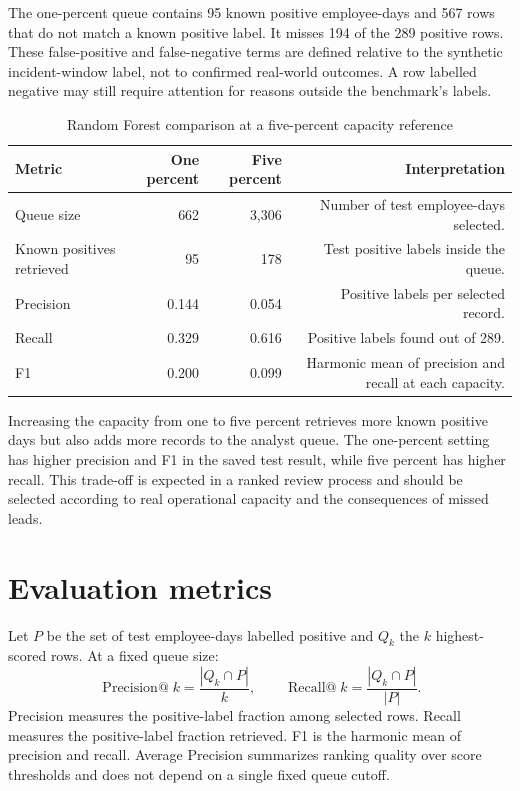 The one-percent queue contains 95 known positive employee-days and 567
rows that do not match a known positive label. It misses 194 of the
289 positive rows. These false-positive and false-negative terms are
defined relative to the synthetic incident-window label, not to
confirmed real-world outcomes. A row labelled negative may still
require attention for reasons outside the benchmark's labels.

\begin{table}[H]
\centering
\tablefont
\caption{Random Forest comparison at a five-percent capacity reference}
\label{tab:five-percent}
\begin{tabularx}{\textwidth}{|p{}|R|R|R|}
\hline
\textbf{Metric} & \textbf{One percent} & \textbf{Five percent} & \textbf{Interpretation}\\\hline
Queue size & 662 & 3,306 & Number of test employee-days selected.\\\hline
Known positives retrieved & 95 & 178 & Test positive labels inside the queue.\\\hline
Precision & 0.144 & 0.054 & Positive labels per selected record.\\\hline
Recall & 0.329 & 0.616 & Positive labels found out of 289.\\\hline
F1 & 0.200 & 0.099 & Harmonic mean of precision and recall at each capacity.\\\hline
\end{tabularx}
\end{table}

Increasing the capacity from one to five percent retrieves more known
positive days but also adds more records to the analyst queue. The
one-percent setting has higher precision and F1 in the saved test
result, while five percent has higher recall. This trade-off is
expected in a ranked review process and should be selected according to
real operational capacity and the consequences of missed leads.

\section{Evaluation metrics}
Let \(P\) be the set of test employee-days labelled positive and
\(Q_k\) the \(k\) highest-scored rows. At a fixed queue size:
\[
\operatorname{Precision@}k = \frac{|Q_k\cap P|}{k},
\qquad
\operatorname{Recall@}k = \frac{|Q_k\cap P|}{|P|}.
\]
Precision measures the positive-label fraction among selected rows.
Recall measures the positive-label fraction retrieved. F1 is the
harmonic mean of precision and recall. Average Precision summarizes
ranking quality over score thresholds and does not depend on a single
fixed queue cutoff.

